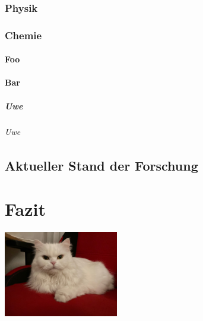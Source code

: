 \documentclass[ngerman,12pt,parskip=half]{scrreprt}
\begin{document}
\blindtext[5]

\subsection{Physik}

\blindtext[5]

\subsection{Chemie}

\blindtext[5]

\subsubsection{Foo}

\blindtext[5]

\subsubsection{Bar}

\blindtext[5]

\paragraph{Uwe} \blindtext

\subparagraph{Uwe} \blindtext

\section{Aktueller Stand der Forschung}

\blindtext[5]

\chapter{Fazit}\label{ch:fazit}

\blindtext[25]

\includegraphics[width=5cm]{Bilder/Katze.jpg}
\end{document}
